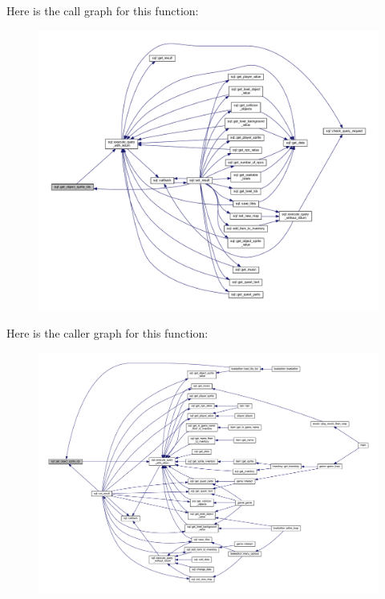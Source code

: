 Here is the call graph for this function\+:
\nopagebreak
\begin{figure}[H]
\begin{center}
\leavevmode
\includegraphics[width=350pt]{classsql_a0ea1aa772cb693be29da61c6cadffd86_cgraph}
\end{center}
\end{figure}
Here is the caller graph for this function\+:
\nopagebreak
\begin{figure}[H]
\begin{center}
\leavevmode
\includegraphics[width=350pt]{classsql_a0ea1aa772cb693be29da61c6cadffd86_icgraph}
\end{center}
\end{figure}
\mbox{\label{classsql_a2466fe5b0ec24e98190ee5763a4a69d1}} 
